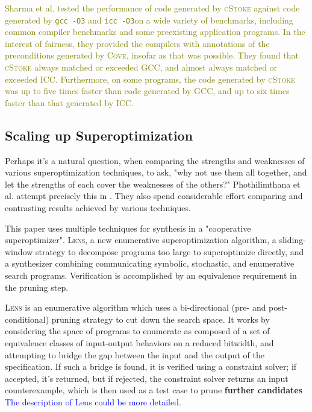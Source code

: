 \documentclass[12pt,twoside]{reedthesis}
\newcommand{\red}[1]{\textcolor{red}{#1}}
\newcommand{\green}[1]{\textcolor{olive}{#1}}
\newcommand{\comment}[2]{\textbf{#1} \textcolor{blue}{#2}}
\begin{document}
        
        \green{
        Sharma et al. tested the performance of code generated by \textsc{cStoke} against code generated by \texttt{gcc -O3} and \texttt{icc -O3}\footnotemark on a wide variety of benchmarks, including common compiler benchmarks and some preexisting application programs.
        In the interest of fairness, they provided the compilers with annotations of the preconditions generated by \textsc{Cove}, insofar as that was possible.
        They found that \textsc{cStoke} always matched or exceeded GCC, and almost always matched or exceeded ICC.
        Furthermore, on some programs, the code generated by \textsc{cStoke} was up to five times faster than code generated by GCC, and up to six times faster than that generated by ICC.
        }
        

    \subsection{Scaling up Superoptimization}
        Perhaps it's a natural question, when comparing the strengths and weaknesses of various superoptimization techniques, to ask, "why not use them all together, and let the strengths of each cover the weaknesses of the others?"
        Phothilimthana et al. attempt precisely this in \cite{phothilimthana2016scaling}.
        They also spend considerable effort comparing and contrasting results achieved by various techniques.
        
        This paper uses multiple techniques for synthesis in a "cooperative superoptimizer".
        \textsc{Lens}, a new enumerative superoptimization algorithm,
        a sliding-window strategy to decompose programs too large to superoptimize directly,
        and a synthesizer combining communicating symbolic, stochastic, and enumerative search programs.
        Verification is accomplished by an equivalence requirement in the pruning step.
        
        \textsc{Lens} is an enumerative algorithm which uses a bi-directional (pre- and post-conditional) pruning strategy to cut down the search space.
        It works by considering the space of programs to enumerate as composed of a set of equivalence classes of input-output behaviors on a reduced bitwidth, and attempting to bridge the gap between the input and the output of the specification.
        If such a bridge is found, it is verified using a constraint solver;
                if accepted, it's returned,
                but if rejected, the constraint solver returns an input counterexample,
            which is then used as a test case to prune \comment{further candidates}{The description of Lens could be more detailed}.
        
\end{document}
